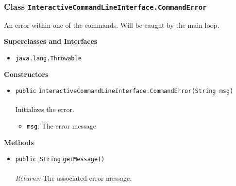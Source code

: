\subsubsection{Class \lstinline|InteractiveCommandLineInterface.CommandError|}
An error within one of the commands. Will be caught by the main loop. \\
\noindent\begin{minipage}[t]{5cm}
\vspace{0.3em}
\hspace*{2em}
\vspace{0.3em}
\end{minipage}



\textbf{\sffamily Superclasses and Interfaces}
\begin{itemize}
\item \lstinline|java.lang.Throwable|
\end{itemize}


\textbf{\sffamily Constructors}
\begin{itemize}
\item \lstinline|public| \lstinline|InteractiveCommandLineInterface.CommandError|\lstinline|(String msg)|\\ \\[-0.6em]
Initializes the error.
\begin{itemize}
\item \lstinline|msg|: The error message
\end{itemize}



\end{itemize}


\textbf{\sffamily Methods}
\begin{itemize}
\item \lstinline|public String| \lstinline|getMessage|\lstinline|()|\\ \\[-0.6em]
\emph{Returns:} The associated error message.



\end{itemize}

